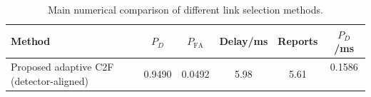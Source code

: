 \begin{table}[t]
    \centering
    \caption{Main numerical comparison of different link selection methods.}
    \label{tab:main_summary}
    \begin{tabular}{l c c c c c}
        \hline
        Method & $P_D$ & $P_{\mathrm{FA}}$ & Delay/ms & Reports & $P_D$/ms \\
        \hline
        Proposed adaptive C2F (detector-aligned) & 0.9490 & 0.0492 & 5.98 & 5.61 & 0.1586 \
        \hline
    \end{tabular}
\end{table}
